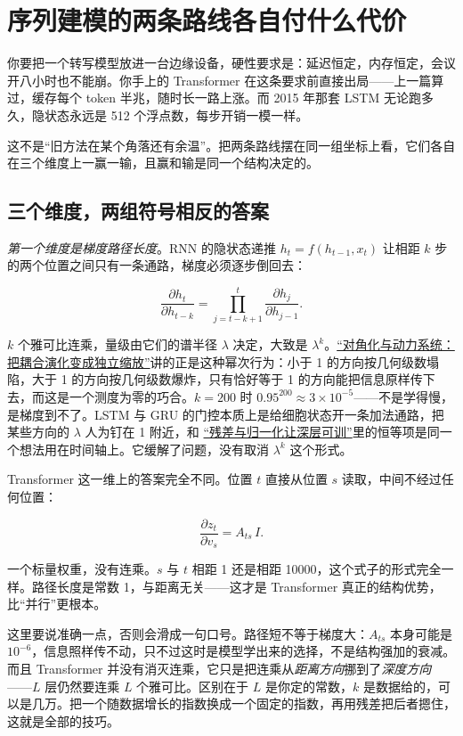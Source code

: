 \section{序列建模的两条路线各自付什么代价}
\label{sec:14-Deep-Learning/05-Attention-and-Sequence-Models/06}

你要把一个转写模型放进一台边缘设备，硬性要求是：延迟恒定，内存恒定，会议开八小时也不能崩。你手上的 Transformer 在这条要求前直接出局——上一篇算过，缓存每个 token 半兆，随时长一路上涨。而 2015 年那套 LSTM 无论跑多久，隐状态永远是 512 个浮点数，每步开销一模一样。

这不是``旧方法在某个角落还有余温''。把两条路线摆在同一组坐标上看，它们各自在三个维度上一赢一输，且赢和输是同一个结构决定的。

\subsection{三个维度，两组符号相反的答案}

\emph{第一个维度是梯度路径长度}。RNN 的隐状态递推 \(h_t=f(h_{t-1},x_t)\) 让相距 \(k\) 步的两个位置之间只有一条通路，梯度必须逐步倒回去：

\[
\frac{\partial h_t}{\partial h_{t-k}} = \prod_{j=t-k+1}^{t} \frac{\partial h_j}{\partial h_{j-1}} .
\]

\(k\) 个雅可比连乘，量级由它们的谱半径 \(\lambda\) 决定，大致是 \(\lambda^{k}\)。\hyperref[sec:03-Linear-Algebra/05-Eigenvalues-and-Eigenvectors/02]{``对角化与动力系统：把耦合演化变成独立缩放''}讲的正是这种幂次行为：小于 1 的方向按几何级数塌陷，大于 1 的方向按几何级数爆炸，只有恰好等于 1 的方向能把信息原样传下去，而这是一个测度为零的巧合。\(k=200\) 时 \(0.95^{200}\approx 3\times10^{-5}\)——不是学得慢，是梯度到不了。LSTM 与 GRU 的门控本质上是给细胞状态开一条加法通路，把某些方向的 \(\lambda\) 人为钉在 1 附近，和 \hyperref[sec:14-Deep-Learning/05-Attention-and-Sequence-Models/04]{``残差与归一化让深层可训''}里的恒等项是同一个想法用在时间轴上。它缓解了问题，没有取消 \(\lambda^k\) 这个形式。

Transformer 这一维上的答案完全不同。位置 \(t\) 直接从位置 \(s\) 读取，中间不经过任何位置：

\[
\frac{\partial z_t}{\partial v_s} = A_{ts}\,I .
\]

一个标量权重，没有连乘。\(s\) 与 \(t\) 相距 1 还是相距 10000，这个式子的形式完全一样。路径长度是常数 1，与距离无关——这才是 Transformer 真正的结构优势，比``并行''更根本。

这里要说准确一点，否则会滑成一句口号。路径短不等于梯度大：\(A_{ts}\) 本身可能是 \(10^{-6}\)，信息照样传不动，只不过这时是模型学出来的选择，不是结构强加的衰减。而且 Transformer 并没有消灭连乘，它只是把连乘从\emph{距离方向}挪到了\emph{深度方向}——\(L\) 层仍然要连乘 \(L\) 个雅可比。区别在于 \(L\) 是你定的常数，\(k\) 是数据给的，可以是几万。把一个随数据增长的指数换成一个固定的指数，再用残差把后者摁住，这就是全部的技巧。

